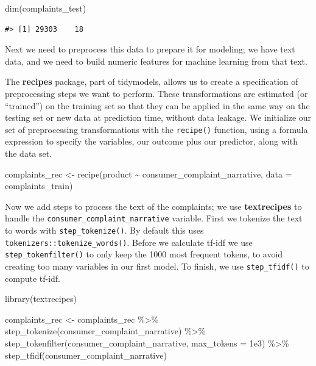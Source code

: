 \documentclass[
]{krantz}
\makeatletter
\newenvironment{Shaded}{\begin{snugshade}}{\end{snugshade}}
\newcommand{\AttributeTok}[1]{\textcolor[rgb]{0.77,0.63,0.00}{#1}}
\newcommand{\FloatTok}[1]{\textcolor[rgb]{0.00,0.00,0.81}{#1}}
\newcommand{\FunctionTok}[1]{\textcolor[rgb]{0.00,0.00,0.00}{#1}}
\newcommand{\NormalTok}[1]{#1}
\newcommand{\OtherTok}[1]{\textcolor[rgb]{0.56,0.35,0.01}{#1}}
\newcommand{\SpecialCharTok}[1]{\textcolor[rgb]{0.00,0.00,0.00}{#1}}
\newenvironment{kframe}{%
\medskip{}
\setlength{\fboxsep}{.8em}
 \def\at@end@of@kframe{}%
 \ifinner\ifhmode%
  \def\at@end@of@kframe{\end{minipage}}%
  \begin{minipage}{\columnwidth}%
 \fi\fi%
 \def\FrameCommand##1{\hskip\@totalleftmargin \hskip-\fboxsep
 \colorbox{shadecolor}{##1}\hskip-\fboxsep
     \hskip-\linewidth \hskip-\@totalleftmargin \hskip\columnwidth}%
 \MakeFramed {\advance\hsize-\width
   \@totalleftmargin\z@ \linewidth\hsize
   \@setminipage}}%
 {\par\unskip\endMakeFramed%
 \at@end@of@kframe}
\renewenvironment{Shaded}{\begin{kframe}}{\end{kframe}}
\makeatother
\begin{document}
\begin{Shaded}
\begin{Highlighting}[]
\FunctionTok{dim}\NormalTok{(complaints\_test)}
\end{Highlighting}
\end{Shaded}

\begin{verbatim}
#> [1] 29303    18
\end{verbatim}

Next we need to preprocess this data to prepare it for modeling; we have text data, and we need to build numeric features for machine learning from that text.

The \textbf{recipes} package, part of tidymodels, allows us to create a specification of preprocessing steps we want to perform. These transformations are estimated (or ``trained'') on the training set so that they can be applied in the same way on the testing set or new data at prediction time, without data leakage.
We initialize our set of preprocessing transformations with the \texttt{recipe()} function, using a formula expression to specify the variables, our outcome plus our predictor, along with the data set.

\begin{Shaded}
\begin{Highlighting}[]
\NormalTok{complaints\_rec }\OtherTok{\textless{}{-}}
  \FunctionTok{recipe}\NormalTok{(product }\SpecialCharTok{\textasciitilde{}}\NormalTok{ consumer\_complaint\_narrative, }\AttributeTok{data =}\NormalTok{ complaints\_train)}
\end{Highlighting}
\end{Shaded}

Now we add steps to process the text of the complaints; we use \textbf{textrecipes} to handle the \texttt{consumer\_complaint\_narrative} variable. First we tokenize the text to words with \texttt{step\_tokenize()}. By default this uses \texttt{tokenizers::tokenize\_words()}.
Before we calculate tf-idf we use \texttt{step\_tokenfilter()} to only keep the 1000 most frequent tokens, to avoid creating too many variables in our first model. To finish, we use \texttt{step\_tfidf()} to compute tf-idf.

\begin{Shaded}
\begin{Highlighting}[]
\FunctionTok{library}\NormalTok{(textrecipes)}

\NormalTok{complaints\_rec }\OtherTok{\textless{}{-}}\NormalTok{ complaints\_rec }\SpecialCharTok{\%\textgreater{}\%}
  \FunctionTok{step\_tokenize}\NormalTok{(consumer\_complaint\_narrative) }\SpecialCharTok{\%\textgreater{}\%}
  \FunctionTok{step\_tokenfilter}\NormalTok{(consumer\_complaint\_narrative, }\AttributeTok{max\_tokens =} \FloatTok{1e3}\NormalTok{) }\SpecialCharTok{\%\textgreater{}\%}
  \FunctionTok{step\_tfidf}\NormalTok{(consumer\_complaint\_narrative)}
\end{Highlighting}
\end{Shaded}
\end{document}
